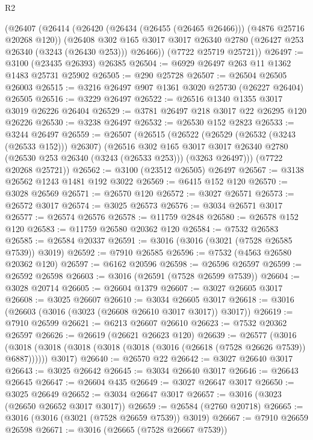 \begin{lexlean}{R2}
\begin{coremodule}
    (@26407
      (@26414
        (@26420 (@26434 (@26455 (@26465 @26466))) (@4876 @25716 @20268 @120))
        (@26408
          @302
          @165
          @3017
          @3017
          @26340
          @2780
          (@26427 @253 @26340 (@3243 (@26430 @253)))
          @26466))
      (@7722 @25719 @25721))
@26497 := @3100 (@23435 @26393) @26385
@26504 := @6929 @26497 @263 @11 @1362 @1483 @25731 @25902
@26505 := @290 @25728
@26507 := @26504 @26505 @26003
@26515 := @3216 @26497 @907 @1361 @3020 @25730 (@26227 @26404) @26505
@26516 := @3229 @26497
@26522 := @26516 @1340 @1355 @3017 @3019 @26226 @26404
@26529 := @3781 @26497 @218 @3017 @22 @26295 @120 @26226
@26530 := @3238 @26497
@26532 := @26530 @152 @2823
@26533 := @3244 @26497
@26559 := @26507
    (@26515
      (@26522
        (@26529 (@26532 (@3243 (@26533 @152))) @26307)
        (@26516
          @302
          @165
          @3017
          @3017
          @26340
          @2780
          (@26530 @253 @26340 (@3243 (@26533 @253)))
          (@3263 @26497)))
      (@7722 @20268 @25721))
@26562 := @3100 (@23512 @26505) @26497
@26567 := @3138 @26562 @1243 @1481 @192 @3022
@26569 := @6415 @152 @120
@26570 := @3028 @26569
@26571 := @26570 @120
@26572 := @3027 @26571
@26573 := @26572 @3017
@26574 := @3025 @26573
@26576 := @3034 @26571 @3017
@26577 := @26574 @26576
@26578 := @11759 @2848
@26580 := @26578 @152 @120
@26583 := @11759 @26580 @20362 @120
@26584 := @7532 @26583
@26585 := @26584 @20337
@26591 := @3016 (@3016 (@3021 (@7528 @26585 @7539)) @3019)
@26592 := @7910 @26585
@26596 := @7532 (@4563 @26580 @20362 @120)
@26597 := @6162 @20596
@26598 := @26596 @26597
@26599 := @26592 @26598
@26603 := @3016 (@26591 (@7528 @26599 @7539))
@26604 := @3028 @20714
@26605 := @26604 @1379
@26607 := @3027 @26605 @3017
@26608 := @3025 @26607
@26610 := @3034 @26605 @3017
@26618 := @3016 (@26603 (@3016 (@3023 (@26608 @26610 @3017 @3017)) @3017))
@26619 := @7910 @26599
@26621 := @6213 @26607 @26610
@26623 := @7532 @20362 @26597
@26626 := @26619 (@26621 @26623 @120)
@26639 := @26577
    (@3016
      (@3018 (@3018 (@3018 (@3018 (@3018 (@3016 (@26618 (@7528 @26626 @7539)) @6887))))))
      @3017)
@26640 := @26570 @22
@26642 := @3027 @26640 @3017
@26643 := @3025 @26642
@26645 := @3034 @26640 @3017
@26646 := @26643 @26645
@26647 := @26604 @435
@26649 := @3027 @26647 @3017
@26650 := @3025 @26649
@26652 := @3034 @26647 @3017
@26657 := @3016 (@3023 (@26650 @26652 @3017 @3017))
@26659 := @26584 (@2760 @20718)
@26665 := @3016 (@3016 (@3021 (@7528 @26659 @7539)) @3019)
@26667 := @7910 @26659 @26598
@26671 := @3016 (@26665 (@7528 @26667 @7539))

\end{coremodule}
\end{lexlean}
